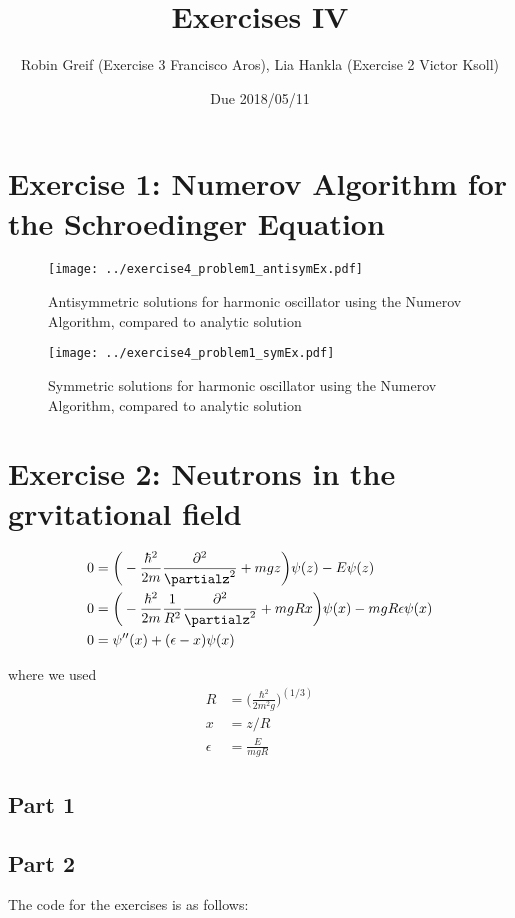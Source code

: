 \documentclass[12pt,a4paper,twoside]{article}
\title{Exercises IV}
\author{Robin Greif (Exercise 3 Francisco Aros), Lia Hankla (Exercise 2 Victor Ksoll)}
\date{Due 2018/05/11}
\begin{document}
\maketitle

\section{Exercise 1: Numerov Algorithm for the Schroedinger Equation}

\begin{figure}[h!]
  \centering
  \texttt{[image: ../exercise4\_problem1\_antisymEx.pdf]}
  \caption{Antisymmetric solutions for harmonic oscillator using the Numerov Algorithm, compared to analytic solution} 
  \label{fig:1a}
\end{figure}

\begin{figure}[h!]
  \centering
  \texttt{[image: ../exercise4\_problem1\_symEx.pdf]}
  \caption{Symmetric solutions for harmonic oscillator using the Numerov Algorithm, compared to analytic solution} 
  \label{fig:1b}
\end{figure}


\section*{Exercise 2: Neutrons in the grvitational field}

\begin{align*}
  0 &= \bigg(-\frac{\hbar^2}{2m} \frac{\partial^2}{\partialz^2} + mgz \bigg)
            \psi(z) - E \psi(z)  \\     
  0 &= \bigg(-\frac{\hbar^2}{2m} \frac{1}{R^2} \frac{\partial^2}{\partialz^2} + mgRx \bigg)
            \psi(x) - mgR\epsilon \psi(x)  \\       
  0 &= \psi''(x) + (\epsilon - x) \psi(x)  
\end{align*}

where we used
\begin{align*}
  R &= \bigg( \frac{\hbar^2}{2m^2g} \bigg) ^(1/3)  \\
  x &= z/R  \\
  \epsilon &= \frac{E}{mgR}  
\end{align*}


\subsection*{Part 1}




\subsection*{Part 2}


%
The code for the exercises is as follows:

\end{document}
